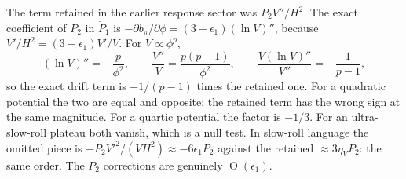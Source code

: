 \documentclass[a4paper,11pt]{article}
\newcommand{\semibold}[1]{{\fontseries{b}\selectfont{#1}}}
\DeclareMathOperator{\Or}{O}
\newenvironment{calculation}{\begin{tcolorbox}[enhanced,breakable,colback=SussexPowderBlue!10,colframe=SussexCobaltBlue!30]\small}{\end{tcolorbox}}
\newcommand{\epsSR}{\epsilon_1}              %
\newcommand{\Hub}{H}                         %
\newcommand{\field}{\phi}                    %
\newcommand{\mom}{\pi}                       %
\newcommand{\Vpot}{V}                        %
\begin{document}
\begin{calculation}
\semibold{The dropped terms are not small.} The term retained in the
earlier response sector was $P_2\Vpot''/\Hub^2$. The exact coefficient of
$P_2$ in $\dot P_1$ is
$-\partial b_\mom/\partial\field = (3-\epsSR)(\ln\Vpot)''$, because
$\Vpot'/\Hub^2=(3-\epsSR)\Vpot'/\Vpot$. For $\Vpot\propto\field^p$,
\begin{equation}
    (\ln\Vpot)'' = -\frac{p}{\field^2} ,
    \qquad
    \frac{\Vpot''}{\Vpot} = \frac{p(p-1)}{\field^2} ,
    \qquad
    \frac{\Vpot(\ln\Vpot)''}{\Vpot''} = -\frac{1}{p-1} ,
\end{equation}
so the exact drift term is $-1/(p-1)$ times the retained one. For a
quadratic potential the two are equal and opposite: the retained term has
the wrong sign at the same magnitude. For a quartic potential the factor
is $-1/3$. For an ultra-slow-roll plateau both vanish, which is a null
test. In slow-roll language the omitted piece is
$-P_2\Vpot'^2/(\Vpot\Hub^2)\approx-6\epsSR P_2$ against the retained
$\approx3\eta_V P_2$: the same order. The $\dot P_2$ corrections are
genuinely $\Or(\epsSR)$.
\end{calculation}
\end{document}
